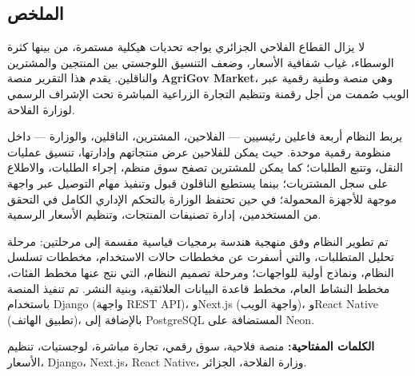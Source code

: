 \newpage
\begin{Arabic}
	
	\chapter*{الملخص}
\raggedleft



لا يزال القطاع الفلاحي الجزائري يواجه تحديات هيكلية مستمرة، من بينها كثرة الوسطاء، غياب شفافية الأسعار، وضعف التنسيق اللوجستي بين المنتجين والمشترين والناقلين. يقدم هذا التقرير منصة \textbf{AgriGov Market}، وهي منصة وطنية رقمية عبر الويب صُممت من أجل رقمنة وتنظيم التجارة الزراعية المباشرة تحت الإشراف الرسمي لوزارة الفلاحة.

يربط النظام أربعة فاعلين رئيسيين — الفلاحين، المشترين، الناقلين، والوزارة — داخل منظومة رقمية موحدة. حيث يمكن للفلاحين عرض منتجاتهم وإدارتها، تنسيق عمليات النقل، وتتبع الطلبات؛ كما يمكن للمشترين تصفح سوق منظم، إجراء الطلبات، والاطلاع على سجل المشتريات؛ بينما يستطيع الناقلون قبول وتنفيذ مهام التوصيل عبر واجهة موجهة للأجهزة المحمولة؛ في حين تحتفظ الوزارة بالتحكم الإداري الكامل في التحقق من المستخدمين، إدارة تصنيفات المنتجات، وتنظيم الأسعار الرسمية.

تم تطوير النظام وفق منهجية هندسة برمجيات قياسية مقسمة إلى مرحلتين: مرحلة تحليل المتطلبات، والتي أسفرت عن مخططات حالات الاستخدام، مخططات تسلسل النظام، ونماذج أولية للواجهات؛ ومرحلة تصميم النظام، التي نتج عنها مخطط الفئات، مخطط النشاط العام، مخطط قاعدة البيانات العلائقية، وبنية النشر. تم تنفيذ المنصة باستخدام Django (واجهة REST API)، وNext.js (واجهة الويب)، وReact Native (تطبيق الهاتف)، بالإضافة إلى PostgreSQL المستضافة على Neon.

\vspace{0.5cm}
\noindent\textbf{الكلمات المفتاحية:} منصة فلاحية، سوق رقمي، تجارة مباشرة، لوجستيات، تنظيم الأسعار، Django، Next.js، React Native، وزارة الفلاحة، الجزائر.

\end{Arabic}

